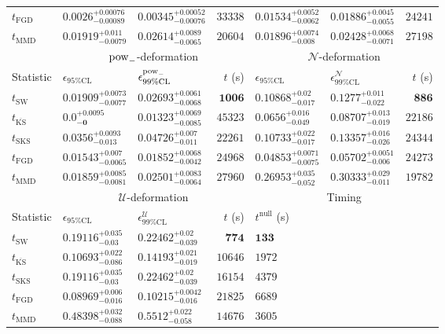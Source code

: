 \begin{tabular}{l|llr|llr}
	$t_{\mathrm{FGD}}$ & ${\mathbf{0.0026_{-0.00089}^{+0.00076}}}$ & ${\mathbf{0.00345_{-0.00076}^{+0.00052}}}$ & $33338$ & $0.01534_{-0.0062}^{+0.0052}$ & $0.01886_{-0.0055}^{+0.0045}$ & $24241$ \\
	$t_{\mathrm{MMD}}$ & $0.01919_{-0.0079}^{+0.011}$ & $0.02614_{-0.0065}^{+0.0089}$ & $20604$ & $0.01896_{-0.008}^{+0.0074}$ & $0.02428_{-0.0071}^{+0.0068}$ & $27198$ \\
	\toprule
	\multicolumn{1}{c}{} & \multicolumn{3}{c}{$\rm{pow}_{-}$-deformation} & \multicolumn{3}{c}{$\mathcal{N}$-deformation} \\
	Statistic & $\epsilon_{95\%\mathrm{CL}}$ & $\epsilon^  {\rm{pow}_{-}}_{99\%\mathrm{CL}}$ & $t$ (s) & $\epsilon_{95\%\mathrm{CL}}$ & $\epsilon^    {\mathcal{N}}_{99\%\mathrm{CL}}$ & $t$ (s) \\
	\midrule
	$t_{\mathrm{SW}}$ & $0.01909_{-0.0077}^{+0.0073}$ & $0.02693_{-0.0068}^{+0.0061}$ & ${\mathbf{1006}}$ & $0.10868_{-0.017}^{+0.02}$ & $0.1277_{-0.022}^{+0.011}$ & ${\mathbf{886}}$ \\
	$t_{\overline{\mathrm{KS}}}$ & ${\mathbf{0.0_{-0}^{+0.0095}}}$ & ${\mathbf{0.01323_{-0.0085}^{+0.0069}}}$ & $45323$ & $0.0656_{-0.049}^{+0.016}$ & $0.08707_{-0.019}^{+0.013}$ & $22186$ \\
	$t_{\mathrm{SKS}}$ & $0.0356_{-0.013}^{+0.0093}$ & $0.04726_{-0.011}^{+0.007}$ & $22261$ & $0.10733_{-0.017}^{+0.022}$ & $0.13357_{-0.026}^{+0.016}$ & $24344$ \\
	$t_{\mathrm{FGD}}$ & $0.01543_{-0.0065}^{+0.007}$ & $0.01852_{-0.0042}^{+0.0068}$ & $24968$ & ${\mathbf{0.04853_{-0.0075}^{+0.0071}}}$ & ${\mathbf{0.05702_{-0.006}^{+0.0051}}}$ & $24273$ \\
	$t_{\mathrm{MMD}}$ & $0.01859_{-0.0081}^{+0.0085}$ & $0.02501_{-0.0064}^{+0.0083}$ & $27960$ & $0.26953_{-0.052}^{+0.035}$ & $0.30333_{-0.011}^{+0.029}$ & $19782$ \\
	\toprule
	\multicolumn{1}{c}{} & \multicolumn{3}{c}{$\mathcal{U}$-deformation} & \multicolumn{3}{c}{Timing} \\
	Statistic & $\epsilon_{95\%\mathrm{CL}}$ & $\epsilon^    {\mathcal{U}}_{99\%\mathrm{CL}}$ & $t$ (s) & $t^{\mathrm{null}}$ (s) \\
	\midrule
	$t_{\mathrm{SW}}$ & $0.19116_{-0.03}^{+0.035}$ & $0.22462_{-0.039}^{+0.02}$ & ${\mathbf{774}}$ & ${\mathbf{133}}$ \\
	$t_{\overline{\mathrm{KS}}}$ & $0.10693_{-0.086}^{+0.022}$ & $0.14193_{-0.019}^{+0.021}$ & $10646$ & $1972$ \\
	$t_{\mathrm{SKS}}$ & $0.19116_{-0.03}^{+0.035}$ & $0.22462_{-0.039}^{+0.02}$ & $16154$ & $4379$ \\
	$t_{\mathrm{FGD}}$ & ${\mathbf{0.08969_{-0.016}^{+0.006}}}$ & ${\mathbf{0.10215_{-0.016}^{+0.0042}}}$ & $21825$ & $6689$ \\
	$t_{\mathrm{MMD}}$ & $0.48398_{-0.088}^{+0.032}$ & $0.5512_{-0.058}^{+0.022}$ & $14676$ & $3605$ \\
	\bottomrule
\end{tabular}